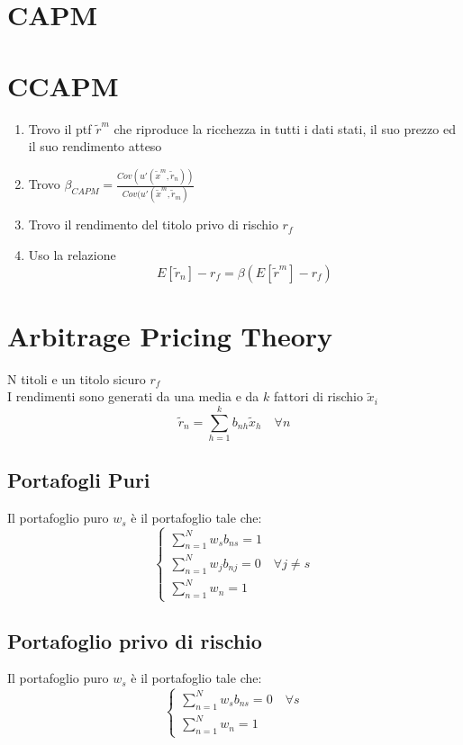 \documentclass[a4paper,notitlepage]{report}%
\begin{document}
\begin{multicols*}{2}
\section*{CAPM}



\section*{CCAPM}
    \begin{enumerate}
        \item Trovo il ptf $\tilde{r}^m$ che riproduce la ricchezza in tutti i dati stati, il suo prezzo ed il suo rendimento atteso
        \item Trovo $\beta_{CAPM} = \frac{Cov(u'(\tilde{x}^m,\tilde{r}_n))}{Cov(u'(\tilde{x}^m,\tilde{r}_m)}$
        \item Trovo il rendimento del titolo privo di rischio $r_f$
        \item Uso la relazione \[
                E[\tilde{r}_n]-r_f = \beta (E[\tilde{r}^m]-r_f) 
            \]
    \end{enumerate}


\section*{Arbitrage Pricing Theory}
    N titoli e un titolo sicuro $r_f$\\
    I rendimenti sono generati da una media e da $k$ fattori
    di rischio $\tilde{x}_i$
    \[
        \tilde{r}_n = \sum_{h=1}^k b_{nh} \tilde{x}_h \quad \forall n  
    \]

    \subsection*{Portafogli Puri}
    Il portafoglio puro $w_s$ è il portafoglio tale che:
    \[
        \left\{\begin{array}{l}
            \sum_{n=1}^N w_s b_{ns} = 1 \\
            \sum_{n=1}^N w_j b_{nj} = 0 \quad \forall j\neq s \\
            \sum_{n=1}^N w_n  = 1
        \end{array}\right.  
    \]

    \subsection*{Portafoglio privo di rischio}
    Il portafoglio puro $w_s$ è il portafoglio tale che:
    \[
        \left\{\begin{array}{l}
            \sum_{n=1}^N w_s b_{ns} = 0 \quad \forall s \\
            \sum_{n=1}^N w_n  = 1
        \end{array}\right.  
    \]


\end{multicols*}
\end{document}
